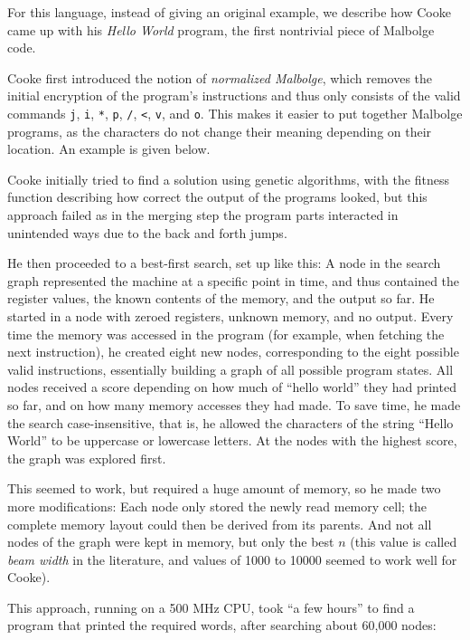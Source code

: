 For this language, instead of giving an original example, we describe how Cooke came up with his \emph{Hello World} program, the first nontrivial piece of Malbolge code.

Cooke first introduced the notion of \emph{normalized Malbolge}, which removes the initial encryption of the program's instructions and thus only consists of the valid commands \texttt{j}, \texttt{i}, \texttt{*}, \texttt{p}, \texttt{/}, \texttt{<}, \texttt{v}, and \texttt{o}. This makes it easier to put together Malbolge programs, as the characters do not change their meaning depending on their location. An example is given below.

Cooke initially tried to find a solution using genetic algorithms, with the fitness function describing how correct the output of the programs looked, but this approach failed as in the merging step the program parts interacted in unintended ways due to the back and forth jumps.

He then proceeded to a best-first search, set up like this: A node in the search graph represented the machine at a specific point in time, and thus contained the register values, the known contents of the memory, and the output so far. He started in a node with zeroed registers, unknown memory, and no output. Every time the memory was accessed in the program (for example, when fetching the next instruction), he created eight new nodes, corresponding to the eight possible valid instructions, essentially building a graph of all possible program states. All nodes received a score depending on how much of “hello world” they had printed so far, and on how many memory accesses they had made. To save time, he made the search case-insensitive, that is, he allowed the characters of the string “Hello World” to be uppercase or lowercase letters. At the nodes with the highest score, the graph was explored first.

This seemed to work, but required a huge amount of memory, so he made two more modifications: Each node only stored the newly read memory cell; the complete memory layout could then be derived from its parents. And not all nodes of the graph were kept in memory, but only the best $n$ (this value is called \emph{beam width} in the literature, and values of 1000 to 10000 seemed to work well for Cooke).

This approach, running on a 500 MHz CPU, took “a few hours” to find a program that printed the required words, after searching about 60,000 nodes:



